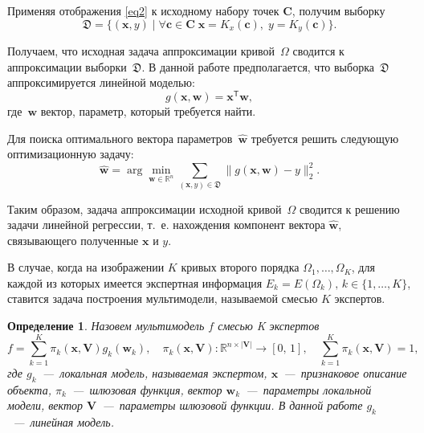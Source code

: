 \documentclass[12pt, twoside]{article}
\newtheorem{definition}{Определение}[section]
\numberwithin{equation}{section}
\begin{document}
Применяя отображения \eqref{eq2} к исходному набору точек $\mathbf{C}$, получим выборку 
\begin{equation}
\label{eq4}
    \mathfrak{D} = \{(\mathbf{x}, y) \; | \; \forall \mathbf{c} \in \mathbf{C} \; \mathbf{x} = K_x(\mathbf{c}), \; y = K_y(\mathbf{c}) \}.
\end{equation}

Получаем, что исходная задача аппроксимации кривой~$\Omega$ сводится к аппроксимации выборки~$\mathfrak{D}$. В данной работе предполагается, что выборка~$\mathfrak{D}$ аппроксимируется линейной моделью:
\begin{equation}
	g(\mathbf{x}, \mathbf{w}) = \mathbf{x}^\mathsf{T} \mathbf{w},
\end{equation} 
где~$\mathbf{w}$ вектор, параметр, который требуется найти.

Для поиска оптимального вектора параметров~$\hat{\mathbf{w}}$ требуется решить следующую оптимизационную задачу:
\begin{equation}
	\hat{\mathbf{w}} = \arg\min_{\mathbf{w}\in\mathbb{R}^n} \sum_{\left(\mathbf{x}, y\right) \in \mathfrak{D}}\|g(\mathbf{x}, \mathbf{w}) - y \|_2^2.
\end{equation} 

Таким образом, задача аппроксимации исходной кривой~$\Omega$ сводится к решению задачи линейной регрессии, т.~е. нахождения компонент вектора $\hat{\mathbf{w}}$, связывающего полученные $\mathbf{x}$ и $y$.

В случае, когда на изображении $K$ кривых второго порядка  $\Omega_1, \dots, \Omega_K$, для каждой из которых имеется экспертная информация $E_k = E(\Omega_k), \, k \in \{1, \dots, K\}$, ставится задача построения мультимодели, называемой смесью $K$ экспертов. 

\begin{definition}
Назовем мультимодель $f$ смесью K экспертов
\begin{equation}
	f = \sum\limits_{k = 1}^{K}\pi_k(\mathbf{x}, \mathbf{V})g_k(\mathbf{w}_k),  \quad \pi_k(\mathbf{x}, \mathbf{V}): \mathbb{R}^{n\times |\mathbf{V}|} \rightarrow [0, \, 1], \quad \sum\limits_{k = 1}^{K}\pi_k(\mathbf{x}, \mathbf{V}) = 1, 
\end{equation}
где $g_k$~---~локальная модель, называемая экспертом, $\mathbf{x}$~---~признаковое описание объекта, $\pi_k$~---~шлюзовая функция, вектор $\mathbf{w}_k$~---~параметры локальной модели, вектор $\mathbf{V}$~---~параметры шлюзовой функции. В данной работе $g_k$~---~линейная модель.
\end{definition}
\end{document}
